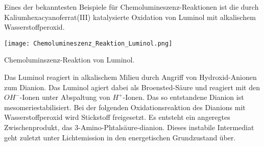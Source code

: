 Eines der bekanntesten Beispiele für Chemolumineszenz-Reaktionen ist die durch Kaliumhexacyanoferrat(III) katalysierte Oxidation von Luminol mit alkalischem Wasserstoffperoxid. 

\begin{dsafigure}
 \centering
 \texttt{[image: Chemolumineszenz\_Reaktion\_Luminol.png]}
 \caption{Chemoluminszenz-Reaktion von Luminol. \cite{Cartus}}
 \label{dsafigure:Chemolumineszenz}
\end{dsafigure}

Das Luminol reagiert in alkalischem Milieu durch Angriff von Hydroxid-Anionen zum Dianion. Das Luminol agiert dabei als Broensted-Säure und reagiert mit den $ OH^{-} $-Ionen unter Abspaltung von $ H^{+} $-Ionen. Das so entstandene Dianion ist mesomeriestabilisiert. 
Bei der folgenden Oxidationsreaktion des Dianions mit Wasserstoffperoxid wird Stickstoff freigesetzt. Es entsteht ein angeregtes Zwischenprodukt, das 3-Amino-Phtalsäure-dianion. Dieses instabile Intermediat geht zuletzt unter Lichtemission in den energetischen Grundzustand über.  
